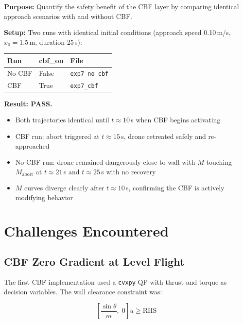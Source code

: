 \documentclass[12pt]{article}
\begin{document}
\textbf{Purpose:} Quantify the safety benefit of the CBF layer by
comparing identical approach scenarios with and without CBF.

\textbf{Setup:} Two runs with identical initial conditions
(approach speed 0.10\,m/s, $x_0 = 1.5$\,m, duration 25\,s):

\begin{center}
\begin{tabular}{lll}
\toprule
\textbf{Run} & \textbf{cbf\_on} & \textbf{File} \\
\midrule
No CBF & False & \texttt{exp7\_no\_cbf} \\
CBF    & True  & \texttt{exp7\_cbf} \\
\bottomrule
\end{tabular}
\end{center}

\textbf{Result: PASS.}
\begin{itemize}
    \item Both trajectories identical until $t \approx 10$\,s when
          CBF begins activating
    \item CBF run: abort triggered at $t \approx 15$\,s, drone
          retreated safely and re-approached
    \item No-CBF run: drone remained dangerously close to wall
          with $M$ touching $M_\mathrm{abort}$ at $t \approx 21$\,s
          and $t \approx 25$\,s with no recovery
    \item $M$ curves diverge clearly after $t \approx 10$\,s,
          confirming the CBF is actively modifying behavior
\end{itemize}

\section{Challenges Encountered}

\subsection{CBF Zero Gradient at Level Flight}

The first CBF implementation used a \texttt{cvxpy} QP with thrust
and torque as decision variables. The wall clearance constraint was:

\begin{equation}
    \left[\frac{\sin\theta}{m},\; 0\right] u \geq \text{RHS}
\end{equation}
\end{document}
